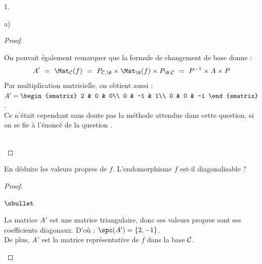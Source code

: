 \begin{noliste}{1.}
\begin{noliste}{a)}
\begin{proof}
      
      \begin{remark}
        On pouvait également remarquer que la formule de changement de 
        base donne :
        \[
          A' \ = \ \Mat_{\cal C}(f) \ = \ P_{{\cal C}, \B} \times 
          \Mat_\B(f) \times P_{\B,{\cal C}} \ = \ P^{-1} \times 
          A \times P
        \]
        Par multiplication matricielle, on obtient aussi : 
        $A' = 
        \begin{smatrix}
          2 & 0 & 0\\
          0 & -1 & 1\\
          0 & 0 & -1
        \end{smatrix}$.\\[.2cm]
        Ce n'était cependant sans doute pas la méthode attendue dans 
	cette question, si on se fie à l'énoncé de la question 
	. 
      \end{remark}~\\[-1.4cm]
    \end{proof}

    
    \item En déduire les valeurs propres de $f$. L'endomorphisme $f$
    est-il diagonalisable ?
    
    \begin{proof}~
      \begin{noliste}{$\sbullet$}
	\item La matrice $A'$ est une matrice triangulaire, donc ses 
	valeurs propres sont ses coefficients diagonaux. D'où :
	$\spc(A') = \{2,-1\}$.\\
	De plus, $A'$ est la matrice représentative de $f$ dans la base 
	${\cal C}$.
	

\end{noliste}
\end{proof}
\end{noliste}
\end{noliste}
